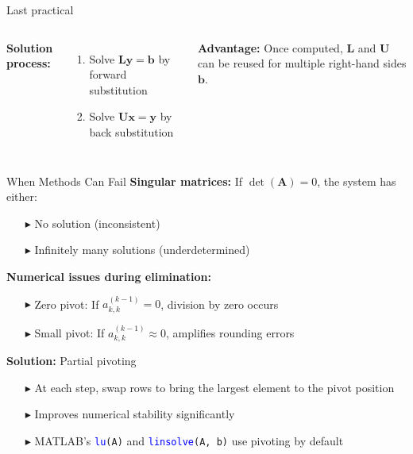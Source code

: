 \documentclass[aspectratio=169]{beamer}
\begin{document}
\begin{frame}{Last practical}
\begin{columns}
{			\textbf{Solution process:}
			\begin{enumerate}
				\item Solve $\mathbf{L}\mathbf{y} = \mathbf{b}$ by forward substitution
				\item Solve $\mathbf{U}\mathbf{x} = \mathbf{y}$ by back substitution
			\end{enumerate}

			\textbf{Advantage:} Once computed, $\mathbf{L}$ and $\mathbf{U}$ can be reused for multiple right-hand sides $\mathbf{b}$.
		}
	\end{columns}
\end{frame}

\begin{frame}{When Methods Can Fail}
	\vspace{-0.5cm}
	\textbf{Singular matrices:} If $\det(\mathbf{A}) = 0$, the system has either:
	\begin{itemize}
		\item[$\blacktriangleright$]
		      No solution (inconsistent)
		\item[$\blacktriangleright$]
		      Infinitely many solutions (underdetermined)
	\end{itemize}

	\vspace{0.3cm}
	\textbf{Numerical issues during elimination:}
	\begin{itemize}
		\item[$\blacktriangleright$]
		      \alert{Zero pivot:} If $a_{k,k}^{(k-1)} = 0$, division by zero occurs

		\item[$\blacktriangleright$]
		      \alert{Small pivot:} If $a_{k,k}^{(k-1)} \approx 0$, amplifies rounding errors
	\end{itemize}

	\vspace{0.3cm}
	\textbf{Solution:} \alert{Partial pivoting}
	\begin{itemize}
		\item[$\blacktriangleright$]
		      At each step, swap rows to bring the largest element to the pivot position
		\item[$\blacktriangleright$]
		      Improves numerical stability significantly
		\item[$\blacktriangleright$]
		      MATLAB's \texttt{\textcolor{blue}{lu}(A)} and \texttt{\textcolor{blue}{linsolve}(A, b)} use pivoting by default
	\end{itemize}
\end{frame}
\end{document}
